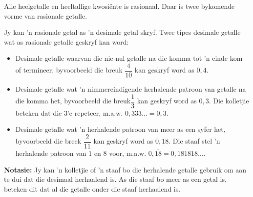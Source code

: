 Alle heelgetalle en heeltallige kwosiënte is rasionaal. Daar is twee bykomende vorme van rasionale getalle.\par 
% 
% 

Jy kan ’n rasionale getal as ’n desimale getal skryf. Twee tipes desimale getalle wat as rasionale getalle geskryf
kan word:\par 
\begin{itemize}
\item Desimale getalle waarvan die nie-nul getalle na die komma tot ’n einde kom of termineer, byvoorbeeld die breuk
 $\dfrac{4}{10}$ kan geskryf word as $0,4$.
\item Desimale getalle wat ’n nimmereindigende herhalende patroon van getalle na die komma het, byvoorbeeld die breuk$\dfrac{1}{3}$ kan geskryf word as
$0,\dot{3}$. 
Die kolletjie beteken dat die $3$’e repeteer, m.a.w. $0,333\ldots=0,\dot{3}$.
\item Desimale getalle wat 'n herhalende patroon van meer as een syfer het, byvoorbeeld die breek $\dfrac{2}{11}$ kan geskryf word as 
$0,\overline{18}$. 
Die staaf stel 'n herhalende patroon van $1$ en $8$ voor, m.a.w.
$0,\overline{18} = 0,181818\ldots$.
\end{itemize}

\par
\textbf{Notasie:} Jy kan 'n kolletjie of 'n staaf bo die herhalende getalle gebruik om aan te dui dat die desimaal herhaalend is. As die staaf bo meer as een getal is, beteken dit dat al die getalle onder die staaf herhaalend is. 


